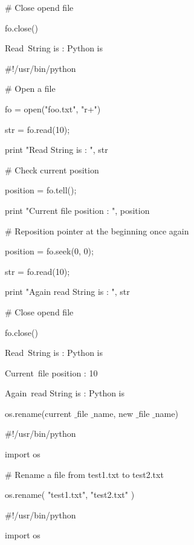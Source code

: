 \vspace{12pt}
 $  \#  $ Close opend file \par
fo.close() \par
\vspace{12pt}
Read~String is :  Python is \par
\vspace{12pt}
 $  \#  $!/usr/bin/python \par
\vspace{12pt}
 $  \#  $ Open a file \par
fo = open("foo.txt", "r+") \par
str = fo.read(10); \par
print "Read String is : ", str \par
\vspace{12pt}
 $  \#  $ Check current position \par
position = fo.tell(); \par
print "Current file position : ", position \par
\vspace{12pt}
 $  \#  $ Reposition pointer at the beginning once again \par
position = fo.seek(0, 0); \par
str = fo.read(10); \par
print "Again read String is : ", str \par
 $  \#  $ Close opend file \par
fo.close() \par
\vspace{12pt}
Read~String is :  Python is \par
Current~file position :  10 \par
Again~read String is :  Python is \par
\vspace{12pt}
os.rename(current $  \_  $file $  \_  $name, new $  \_  $file $  \_  $name) \par
\vspace{12pt}
 $  \#  $!/usr/bin/python \par
import os \par
\vspace{12pt}
 $  \#  $ Rename a file from test1.txt to test2.txt \par
os.rename( "test1.txt", "test2.txt" ) \par
\vspace{12pt}
 $  \#  $!/usr/bin/python \par
import os \par
